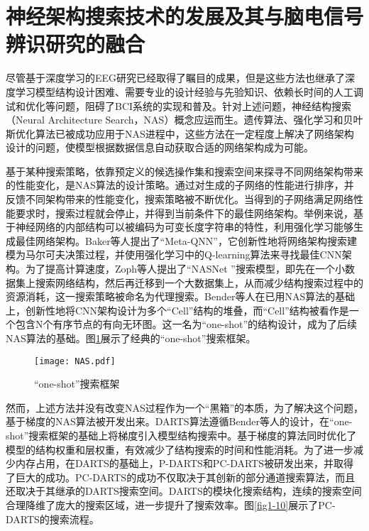 \section{神经架构搜索技术的发展及其与脑电信号辨识研究的融合}
尽管基于深度学习的EEG研究已经取得了瞩目的成果，但是这些方法也继承了深度学习模型结构设计困难、需要专业的设计经验与先验知识、依赖长时间的人工调试和优化等问题，阻碍了BCI系统的实现和普及。针对上述问题，神经结构搜索（Neural Architecture Search，NAS）概念应运而生\cite{1-76}。遗传算法\cite{1-77}、强化学习\cite{3-33}和贝叶斯优化算法\cite{1-78}已被成功应用于NAS进程中，这些方法在一定程度上解决了网络架构设计的问题，使模型根据数据信息自动获取合适的网络架构成为可能。

基于某种搜索策略，依靠预定义的候选操作集和搜索空间来探寻不同网络架构带来的性能变化，是NAS算法的设计策略。通过对生成的子网络的性能进行排序，并反馈不同架构带来的性能变化，搜索策略被不断优化。当得到的子网络满足网络性能要求时，搜索过程就会停止，并得到当前条件下的最佳网络架构\cite{1-76}。举例来说，基于神经网络的内部结构可以被编码为可变长度字符串的特性，利用强化学习能够生成最佳网络架构\cite{1-79}。Baker等人\cite{1-80}提出了“Meta-QNN”，它创新性地将网络架构搜索建模为马尔可夫决策过程，并使用强化学习中的Q-learning算法来寻找最佳CNN架构。为了提高计算速度，Zoph等人\cite{1-81}提出了“NASNet ”搜索模型，即先在一个小数据集上搜索网络结构，然后再迁移到一个大数据集上，从而减少结构搜索过程中的资源消耗，这一搜索策略被命名为代理搜索。Bender等人\cite{1-88}在已用NAS算法的基础上，创新性地将CNN架构设计为多个“Cell”结构的堆叠，而“Cell”结构被看作是一个包含N个有序节点的有向无环图。这一名为“one-shot”的结构设计，成为了后续NAS算法的基础。图\ref{fig1-9}展示了经典的“one-shot”搜索框架。

\begin{figure}[!h]
	\centering
	\texttt{[image: NAS.pdf]}
	\caption{“one-shot”搜索框架\cite{1-88}}
	\label{fig1-9}
\end{figure}

然而，上述方法并没有改变NAS过程作为一个“黑箱”的本质，为了解决这个问题，基于梯度的NAS算法被开发出来。DARTS\cite{3-34}算法遵循Bender等人\cite{1-88}的设计，在“one-shot”搜索框架的基础上将梯度引入模型结构搜索中。基于梯度的算法同时优化了模型的结构权重和层权重，有效减少了结构搜索的时间和性能消耗。为了进一步减少内存占用，在DARTS的基础上，P-DARTS\cite{1-82}和PC-DARTS\cite{3-7}被研发出来，并取得了巨大的成功。PC-DARTS的成功不仅取决于其创新的部分通道搜索算法，而且还取决于其继承的DARTS搜索空间。DARTS的模块化搜索结构，连续的搜索空间合理降维了庞大的搜索区域，进一步提升了搜索效率。图\ref{fig1-10}展示了PC-DARTS的搜索流程。

